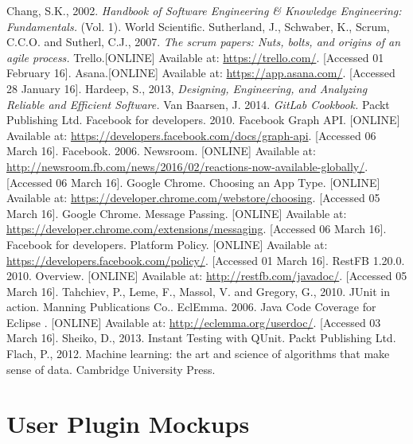 \documentclass[a4paper,11pt]{article}
\begin{document}
\begin{thebibliography}{9}
	Chang, S.K., 2002. 
	\emph{Handbook of Software Engineering \& Knowledge Engineering: Fundamentals.} (Vol. 1). World Scientific. 
	Sutherland, J., Schwaber, K., Scrum, C.C.O. and Sutherl, C.J., 2007. 
	\emph{The scrum papers: Nuts, bolts, and origins of an agile process.} 
	Trello.[ONLINE] Available at: \url{https://trello.com/}. [Accessed 01 February 16].
	Asana.[ONLINE] Available at: \url{https://app.asana.com/}. [Accessed 28 January 16].
	Hardeep, S., 2013, 
	\emph{Designing, Engineering, and Analyzing Reliable and Efficient Software.}
	Van Baarsen, J. 2014.
	\emph{GitLab Cookbook.} Packt Publishing Ltd.
	Facebook for developers. 2010. Facebook Graph API. [ONLINE] Available at: \url{https://developers.facebook.com/docs/graph-api}. [Accessed 06 March 16]. 
	Facebook. 2006. Newsroom. [ONLINE] Available at: \url{http://newsroom.fb.com/news/2016/02/reactions-now-available-globally/}. [Accessed 06 March 16].
	Google Chrome. Choosing an App Type. [ONLINE] Available at: \url{https://developer.chrome.com/webstore/choosing}. [Accessed 05 March 16].
	Google Chrome. Message Passing. [ONLINE] Available at: \url{https://developer.chrome.com/extensions/messaging}. [Accessed 06 March 16].
	Facebook for developers. Platform Policy. [ONLINE] Available at: \url{https://developers.facebook.com/policy/}. [Accessed 01 March 16].
	RestFB 1.20.0. 2010. Overview. [ONLINE] Available at: \url{http://restfb.com/javadoc/}. [Accessed 05 March 16].
	Tahchiev, P., Leme, F., Massol, V. and Gregory, G., 2010. JUnit in action. Manning Publications Co..
	EclEmma. 2006. Java Code Coverage for Eclipse . [ONLINE] Available at: \url{http://eclemma.org/userdoc/}. [Accessed 03 March 16].
	Sheiko, D., 2013. Instant Testing with QUnit. Packt Publishing Ltd.
	Flach, P., 2012. Machine learning: the art and science of algorithms that make sense of data. Cambridge University Press. 
\end{thebibliography}

\newpage
\appendix

\setcounter{figure}{0} 
\captionsetup{skip=3pt}
\section{User Plugin Mockups}
\end{document}
